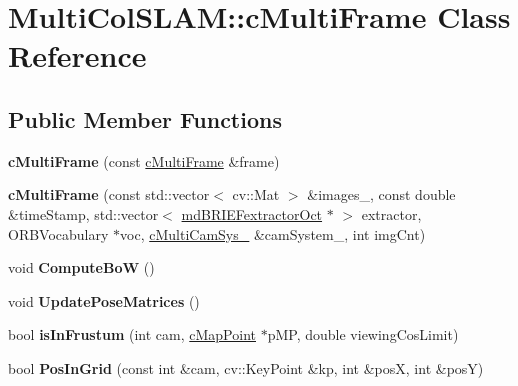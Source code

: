 \hypertarget{classMultiColSLAM_1_1cMultiFrame}{}\section{Multi\+Col\+S\+L\+AM\+:\+:c\+Multi\+Frame Class Reference}
\label{classMultiColSLAM_1_1cMultiFrame}
\subsection*{Public Member Functions}
\begin{DoxyCompactItemize}
\item 
{\bfseries c\+Multi\+Frame} (const \hyperlink{classMultiColSLAM_1_1cMultiFrame}{c\+Multi\+Frame} \&frame)\hypertarget{classMultiColSLAM_1_1cMultiFrame_a6ea7676dfe9ef9766bdabb4946ac5ffe}{}\label{classMultiColSLAM_1_1cMultiFrame_a6ea7676dfe9ef9766bdabb4946ac5ffe}

\item 
{\bfseries c\+Multi\+Frame} (const std\+::vector$<$ cv\+::\+Mat $>$ \&images\+\_\+, const double \&time\+Stamp, std\+::vector$<$ \hyperlink{classMultiColSLAM_1_1mdBRIEFextractorOct}{md\+B\+R\+I\+E\+Fextractor\+Oct} $\ast$ $>$ extractor, O\+R\+B\+Vocabulary $\ast$voc, \hyperlink{classMultiColSLAM_1_1cMultiCamSys__}{c\+Multi\+Cam\+Sys\+\_\+} \&cam\+System\+\_\+, int img\+Cnt)\hypertarget{classMultiColSLAM_1_1cMultiFrame_a908671e3d160f1981727a6404515e51e}{}\label{classMultiColSLAM_1_1cMultiFrame_a908671e3d160f1981727a6404515e51e}

\item 
void {\bfseries Compute\+BoW} ()\hypertarget{classMultiColSLAM_1_1cMultiFrame_a450f2e34479ad04c25092f4600f88c3e}{}\label{classMultiColSLAM_1_1cMultiFrame_a450f2e34479ad04c25092f4600f88c3e}

\item 
void {\bfseries Update\+Pose\+Matrices} ()\hypertarget{classMultiColSLAM_1_1cMultiFrame_ac18ad79d06a81f31144932efe7059a2a}{}\label{classMultiColSLAM_1_1cMultiFrame_ac18ad79d06a81f31144932efe7059a2a}

\item 
bool {\bfseries is\+In\+Frustum} (int cam, \hyperlink{classMultiColSLAM_1_1cMapPoint}{c\+Map\+Point} $\ast$p\+MP, double viewing\+Cos\+Limit)\hypertarget{classMultiColSLAM_1_1cMultiFrame_ad1a799adc5252d170af60346052bcd5d}{}\label{classMultiColSLAM_1_1cMultiFrame_ad1a799adc5252d170af60346052bcd5d}

\item 
bool {\bfseries Pos\+In\+Grid} (const int \&cam, cv\+::\+Key\+Point \&kp, int \&posX, int \&posY)\hypertarget{classMultiColSLAM_1_1cMultiFrame_a1620ec42263c7f56fd6930288777d83d}{}\label{classMultiColSLAM_1_1cMultiFrame_a1620ec42263c7f56fd6930288777d83d}


\end{DoxyCompactItemize}
